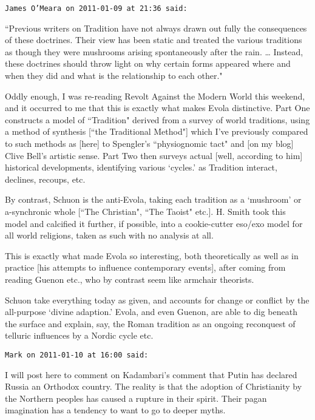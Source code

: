 \begin{footnotesize}\begin{sffamily}



\texttt{James O'Meara on 2011-01-09 at 21:36 said: }

``Previous writers on Tradition have not always drawn out fully the consequences of these doctrines. Their view has been static and treated the various traditions as though they were mushrooms arising spontaneously after the rain. … Instead, these doctrines should throw light on why certain forms appeared where and when they did and what is the relationship to each other."

Oddly enough, I was re-reading Revolt Against the Modern World this weekend, and it occurred to me that this is exactly what makes Evola distinctive. Part One constructs a model of ``Tradition" derived from a survey of world traditions, using a method of synthesis [``the Traditional Method"] which I've previously compared to such methods as [here] to Spengler's ``physiognomic tact" and [on my blog] Clive Bell's artistic sense. Part Two then surveys actual [well, according to him] historical developments, identifying various `cycles.' as Tradition interact, declines, recoups, etc. 

By contrast, Schuon is the anti-Evola, taking each tradition as a `mushroom' or a-synchronic whole [``The Christian", ``The Taoist" etc.]. H. Smith took this model and calcified it further, if possible, into a cookie-cutter eso/exo model for all world religions, taken as such with no analysis at all.

This is exactly what made Evola so interesting, both theoretically as well as in practice [his attempts to influence contemporary events], after coming from reading Guenon etc., who by contrast seem like armchair theorists. 

Schuon take everything today as given, and accounts for change or conflict by the all-purpose `divine adaption.' Evola, and even Guenon, are able to dig beneath the surface and explain, say, the Roman tradition as an ongoing reconquest of telluric influences by a Nordic cycle etc.


\hfill

\texttt{Mark on 2011-01-10 at 16:00 said: }

I will post here to comment on Kadambari's comment that Putin has declared Russia an Orthodox country. The reality is that the adoption of Christianity by the Northern peoples has caused a rupture in their spirit. Their pagan imagination has a tendency to want to go to deeper myths.


\end{sffamily}
\end{footnotesize}
